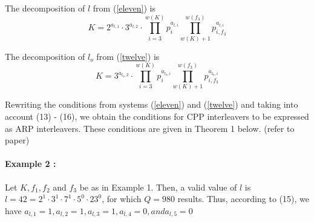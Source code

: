 \documentclass[fontsize=12pt]{article}
\newcommand{\cd}{\cdot}
\begin{document}
The decomposition of $l$ from (\ref{eleven}) is 
\begin{equation}
 K =2^{a_{l,1}}\cdot 3^{a_{l,2}}\cdot \prod^{w(K)}_{i=3}p_i^{a_{l,i}}
 \prod^{w(f_3)}_{w(K)+1}p_{i,f_3}^{a_{l,i}}
\end{equation}

The decomposition of $l_o$ from (\ref{twelve}) is 
\begin{equation}
 K =3^{a_{l_o,2}}\cdot \prod^{w(K)}_{i=3}p_i^{a_{l_o,i}}
 \prod^{w(f_3)}_{w(K)+1}p_{i,f_3}^{a_{l_{o},i}}
\end{equation}

Rewriting the conditions from systems  (\ref{eleven}) and (\ref{twelve}) and
taking into account (13) - (16), we obtain the conditions for
CPP interleavers to be expressed as ARP interleavers. These
conditions are given in Theorem 1 below. (refer to paper)

\paragraph{Example 2 :} Let $K, f_1, f_2$ and $f_3$ be as in Example 1. Then,
a valid value of $l$ is $l = 42 = 2^1 \cdot 3^1 \cd 7^1 \cd 5^0 \cd 23^0$, for which $Q = 980$ results. Thus, according to (15), we have
$a_{l,1} = 1, a_{l,2} = 1, a_{l,3} = 1, a_{l,4} = 0, and a_{l,5} = 0$
\end{document}
